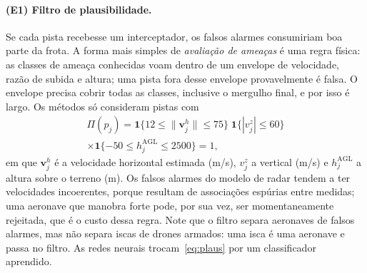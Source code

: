 \paragraph{(E1) Filtro de plausibilidade.} Se cada pista recebesse um interceptador, os falsos alarmes consumiriam boa
parte da frota. A forma mais simples de \emph{avaliação de ameaças} é uma regra física: as classes de ameaça conhecidas
voam dentro de um envelope de velocidade, razão de subida e altura; uma pista fora desse envelope provavelmente é falsa.
O envelope precisa cobrir todas as classes, inclusive o mergulho final, e por isso é largo. Os métodos só consideram
pistas com
\begin{multline}
  \Pi(p_j)=\mathbf{1}\{12\le\|\bm{v}_{j}^{h}\|\le75\}\;\mathbf{1}\{|v_{j}^{z}|\le60\}\\
  \times\mathbf{1}\{-50\le h_j^{\mathrm{AGL}}\le2500\}=1,
  \label{eq:plaus}
\end{multline}
em que $\bm{v}_j^h$ é a velocidade horizontal estimada (m/s), $v_j^z$ a vertical (m/s) e $h_j^{\mathrm{AGL}}$ a altura
sobre o terreno (m). Os falsos alarmes do modelo de radar tendem a ter velocidades incoerentes, porque resultam de
associações espúrias entre medidas; uma aeronave que manobra forte pode, por sua vez, ser momentaneamente rejeitada, que
é o custo dessa regra. Note que o filtro separa aeronaves de falsos alarmes, mas não separa iscas de drones armados:
uma isca é uma aeronave e passa no filtro. As redes neurais trocam~\eqref{eq:plaus} por um classificador aprendido.

